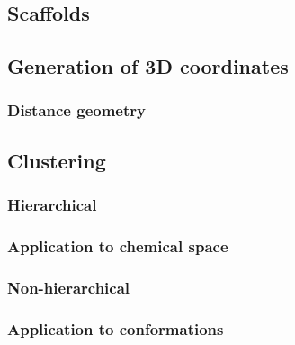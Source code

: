 %



\subsection{Scaffolds}

\subsection{Generation of 3D coordinates}

\subsubsection{Distance geometry}

\subsection{Clustering}

\subsubsection{Hierarchical}

\subsubsection{Application to chemical space}

\subsubsection{Non-hierarchical}

\subsubsection{Application to conformations}
